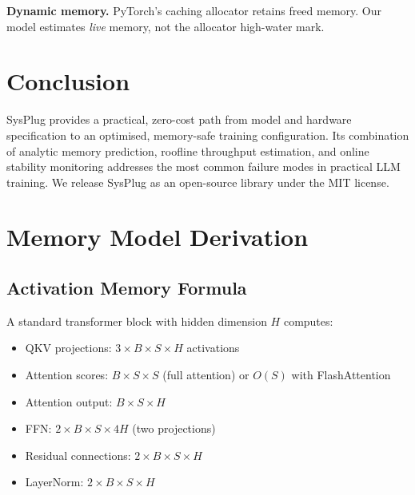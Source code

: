 \documentclass[10pt,twocolumn]{article}
\begin{document}
\textbf{Dynamic memory.}  PyTorch's caching allocator retains freed memory.
Our model estimates \emph{live} memory, not the allocator high-water mark.

\section{Conclusion}

SysPlug provides a practical, zero-cost path from model and hardware
specification to an optimised, memory-safe training configuration.  Its
combination of analytic memory prediction, roofline throughput estimation,
and online stability monitoring addresses the most common failure modes in
practical LLM training.  We release SysPlug as an open-source library under
the MIT license.




\appendix

\section{Memory Model Derivation}
\label{app:memory}

\subsection{Activation Memory Formula}

A standard transformer block with hidden dimension $H$ computes:
\begin{itemize}
  \item QKV projections: $3 \times B \times S \times H$ activations
  \item Attention scores: $B \times S \times S$ (full attention) or $O(S)$ with FlashAttention
  \item Attention output: $B \times S \times H$
  \item FFN: $2 \times B \times S \times 4H$ (two projections)
  \item Residual connections: $2 \times B \times S \times H$
  \item LayerNorm: $2 \times B \times S \times H$
\end{itemize}
\end{document}
